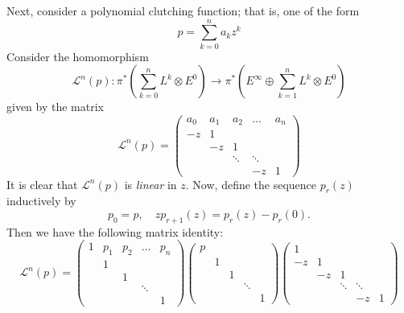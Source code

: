 Next, consider a polynomial clutching function; that is, one of the form
\begin{equation*}
    p = \sum_{k = 0}^n a_k z^k
\end{equation*}
Consider the homomorphism
\begin{equation*}
    \mathcal{L}^n(p): \pi^*\left( \sum_{k = 0}^n L^k \otimes E^0 \right) \to \pi^*\left( E^\infty \oplus \sum_{k = 1}^n L^k \otimes E^0 \right)
\end{equation*}
given by the matrix
\begin{equation*}
    \mathcal{L}^n(p) =
    \begin{pmatrix}
        a_0 & a_1 & a_2 & \ldots & a_n \\
        -z  &  1  &     &        &     \\
            & -z  &  1  &        &     \\
            &     &\ddots& \ddots&     \\
            &     &     &   -z   &  1
    \end{pmatrix}
\end{equation*}
It is clear that $\mathcal{L}^n(p)$ is \textit{linear} in $z$. Now, define the sequence $p_r(z)$ inductively by
\begin{equation*}
    p_0 = p, \quad zp_{r+1}(z) = p_r(z) - p_r(0).
\end{equation*}
Then we have the following matrix identity:
\begin{equation*}
    \mathcal{L}^n(p) =
    \begin{pmatrix}
        1   & p_1 & p_2 & \ldots & p_n \\
            &  1  &     &        &     \\
            &     &  1  &        &     \\
            &     &     & \ddots &     \\
            &     &     &        &  1
    \end{pmatrix}
        \begin{pmatrix}
        p   &     &     &        &     \\
            &  1  &     &        &     \\
            &     &  1  &        &     \\
            &     &     & \ddots &     \\
            &     &     &        &  1
    \end{pmatrix}
        \begin{pmatrix}
        1   &     &     &        &     \\
        -z  &  1  &     &        &     \\
            & -z  &  1  &        &     \\
            &     &\ddots& \ddots&     \\
            &     &     &   -z   &  1
    \end{pmatrix}
\end{equation*}
